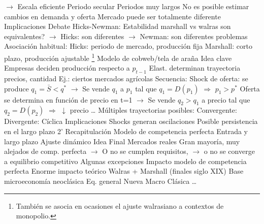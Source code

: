 \documentclass{nuevotema}
\begin{document}
\begin{esquemal}
				\4[] $\to$ Escala eficiente
				\4 Periodo secular
				\4[] Periodos muy largos
				\4[] No es posible estimar cambios en demanda y oferta
				\4[] Mercado puede ser totalmente diferente
			\3 Implicaciones
				\4 Debate Hicks-Newman:
				\4[] Estabilidad marshall vs walras son equivalentes?
				\4[] $\to$ Hicks: son diferentes
				\4[] $\to$ Newman: son diferentes problemas
				\4 Asociación habitual:
				\4[] Hicks: periodo de mercado, producción fija
				\4[] Marshall: corto plazo, producción ajustable \footnote{También se asocia en ocasiones el ajuste walrasiano a contextos de monopolio.}
		\2 Modelo de cobweb/tela de araña
			\3 Idea clave
				\4 Empresas deciden producción respecto a $p_{t-1}$
				\4 Elast. determinan trayectoria precios, cantidad
				\4[] Ej.: ciertos mercados agrícolas
				\4 Secuencia:
				\4[1] Shock de oferta: se produce $q_1 = \bar{S} < q^*$
				\4[] $\to$ Se vende $q_1$ a $p_1$ tal que $q_1=D(p_1)$
				\4[] $\Rightarrow$ $p_1 > p^*$
				\4[2] Oferta se determina en función de precio en t=1
				\4[] $\to$ Se vende $q_2 > q_1$ a precio tal que $q_2 = D(p_2)$
				\4[] $\Rightarrow$ $\downarrow$ precio
				\4[3] \ldots
				\4 Múltiples trayectorias posibles:
				\4[] Convergente: 
				\4[] Divergente: 
				\4[] Cíclica
			\3 Implicaciones
				\4 Shocks generan oscilaciones
				\4 Posible persistencia en el largo plazo
	\1[]  2'
		\2 Recapitulación
			\3 Modelo de competencia perfecta
			\3 Entrada y largo plazo
			\3 Ajuste dinámico
		\2 Idea Final
			\3 Mercados reales
				\4 Gran mayoría, muy alejados de comp. perfecta
				\4[] $\to$ O no se cumplen requisitos,
				\4[] $\to$ o no se converge a equilibrio competitivo
				\4 Algunas excepciones
			\3 Impacto modelo de competencia perfecta
				\4 Enorme impacto teórico
				\4 Walras + Marshall (finales siglo XIX)
				\4[$\to$] Base microeconomía neoclásica
				\4 Eq. general
				\4 Nueva Macro Clásica
				\4 \ldots
\end{esquemal}
\end{document}

